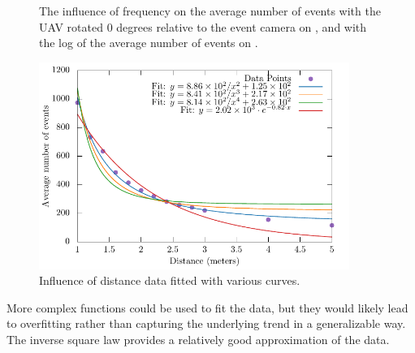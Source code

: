 \begin{figure}[H]
	\centering
	\caption{
  The influence of frequency on the average number of events with the UAV rotated 0 degrees relative to the event camera on , and with the log of the average number of events on .
  }
	\label{fig:freqs}
\end{figure}

\begin{figure}[H]
	\centering
	\includegraphics[width=0.90\textwidth]{./fig/semestral/inverse_square/square.pdf}
	\caption{Influence of distance data fitted with various curves.}
	\label{fig:fit1}
\end{figure}
More complex functions could be used to fit the data, but they would likely lead to overfitting rather than capturing the underlying trend in a generalizable way.
The inverse square law provides a relatively good approximation of the data.

